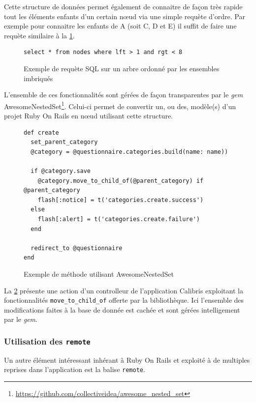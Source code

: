 \documentclass[12pt,a4paper]{book}
\begin{document}
Cette structure de données permet également de connaitre de façon très rapide tout les éléments enfants d'un certain nœud via une simple requète d'ordre. Par exemple pour connaitre les enfants de A (soit C, D et E) il suffit de faire une requète similaire à la \cref{fig.nestedsql}.

\begin{figure}[h]
\lstset{language=sql}
\begin{lstlisting}
select * from nodes where lft > 1 and rgt < 8
\end{lstlisting}
 \caption{Exemple de requète SQL sur un arbre ordonné par les ensembles imbriqués}
 \label{fig.nestedsql}
\end{figure}

L'ensemble de ces fonctionnalités sont gérées de façon transparentes par le \textit{gem} AwesomeNestedSet\footnote{\url{https://github.com/collectiveidea/awesome_nested_set}}. Celui-ci permet de convertir un, ou des, modèle(s) d'un projet Ruby On Rails en nœud utilisant cette structure.

\begin{figure}[h]
\lstset{language=ruby}
\begin{lstlisting}
def create
  set_parent_category
  @category = @questionnaire.categories.build(name: name))

  if @category.save
    @category.move_to_child_of(@parent_category) if @parent_category
    flash[:notice] = t('categories.create.success')
  else
    flash[:alert] = t('categories.create.failure')
  end

  redirect_to @questionnaire
end
\end{lstlisting}
 \caption{Exemple de méthode utilisant AwesomeNestedSet}
 \label{fig.nestedrail}
\end{figure}

La \cref{fig.nestedrail} présente une action d'un controlleur de l'application Calibris exploitant la fonctionnalités \texttt{move\_to\_child\_of} offerte par la bibliothèque. Ici l'ensemble des modifications faites à la base de donnée est cachée et sont gérées intelligement par le \textit{gem}.

\subsubsection{Utilisation des \texttt{remote}}

Un autre élément intéressant inhérant à Ruby On Rails et exploité à de multiples reprises dans l'application est la balise \texttt{remote}.
\end{document}

